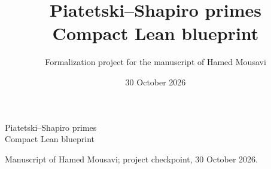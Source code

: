 
\newif\ifDetailed\Detailedfalse
\title{Piatetski--Shapiro primes\\Compact Lean blueprint}
\author{Formalization project for the manuscript of Hamed Mousavi}
\date{30 October 2026}

{\LARGE Piatetski--Shapiro primes\\Compact Lean blueprint\par}
\medskip
{\small Manuscript of Hamed Mousavi; project checkpoint, 30 October 2026.\par}
\medskip


